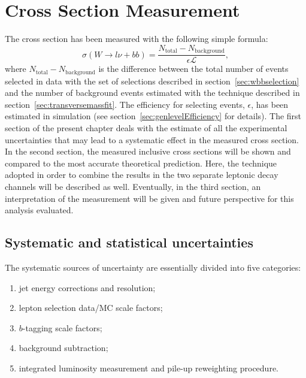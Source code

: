 \section{Cross Section Measurement}
\label{sec:xsections}

The cross section has been measured with the following simple formula:
$$ \sigma (W \rightarrow l \nu + bb) = \frac{N_{\mathrm{total}} - N_{\mathrm{background}}}{\epsilon \mathcal{L}} \mathrm{,}$$
where $N_{\mathrm{total}} - N_{\mathrm{background}}$ is the difference between 
the total number of events selected in data with the set of selections described in 
section~\ref{sec:wbbselection} and the number of background events estimated with 
the technique described in section~\ref{sec:transversemassfit}.
The efficiency for selecting events, $\epsilon$,
has been estimated in simulation (see section~\ref{sec:genlevelEfficiency} for details).
The first section of the present chapter 
deals with the estimate of all the experimental 
uncertainties that may lead to a systematic effect in the measured cross 
section. In the second section, the measured inclusive 
cross sections will be shown and compared to the most accurate 
theoretical prediction. Here, the technique adopted in order to 
combine the results in the two separate leptonic decay channels will 
be described as well.
Eventually, in the third section, an interpretation of the measurement 
will be given and future perspective for this analysis evaluated.

\subsection{Systematic and statistical uncertainties}
\label{sec:systunc}

The systematic sources of uncertainty are essentially divided into
five categories:
\begin{enumerate}
   \item jet energy corrections and resolution;
   \item lepton selection data/MC scale factors;
   \item $b$-tagging scale factors;
   \item background subtraction; 
   \item integrated luminosity measurement and pile-up reweighting procedure.
\end{enumerate}

